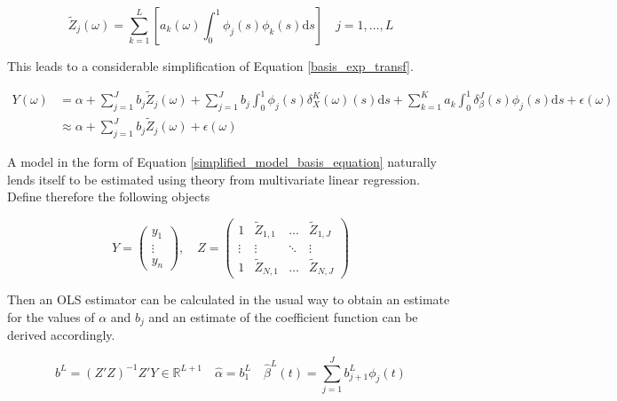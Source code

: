 \documentclass[11pt,twoside,a4paper]{article}
\begin{document}
	\begin{equation}
			\tilde{Z}_j(\omega) = \sum_{k = 1}^{L} \left[a_k(\omega) \int_{0}^{1} \phi_j(s) \phi_k(s) \mathrm{d}s \right] \quad j = 1, \dots, L
	\end{equation}

	This leads to a considerable simplification of Equation \ref{basis_exp_transf}.
	
	\begin{equation}\label{simplified_model_basis_equation}
		\begin{split}
			Y(\omega) &= \alpha + \sum_{j = 1}^{J} b_j \tilde{Z}_j(\omega) + \sum_{j = 1}^{J} b_j  \int_{0}^{1} \phi_j(s) \delta_{X}^{K}(\omega)(s) \mathrm{d}s + \sum_{k = 1}^{K} a_k  \int_{0}^{1} \delta_{\beta}^{J}(s)\phi_j(s) \mathrm{d}s + \epsilon(\omega) \\
			& \approx \alpha + \sum_{j = 1}^{J} b_j \tilde{Z}_j(\omega) + \epsilon(\omega)
		\end{split}
	\end{equation}

	A model in the form of Equation \ref{simplified_model_basis_equation} naturally lends itself to be estimated using theory from multivariate linear regression. Define therefore the following objects
	
	\begin{equation}\label{regressor_mat_1}
		Y = \begin{pmatrix}
			y_1 \\ \vdots \\ y_n
		\end{pmatrix}, \quad
		Z = \begin{pmatrix}
			1 & \tilde{Z}_{1,1} & \dots & \tilde{Z}_{1,J} \\
			\vdots & \vdots & \ddots & \vdots \\
			1 & \tilde{Z}_{N,1} & \dots & \tilde{Z}_{N,J}
		\end{pmatrix}
	\end{equation}
	
	Then an OLS estimator can be calculated in the usual way to obtain an estimate for the values of $\alpha$ and $b_j$ and an estimate of the coefficient function can be derived accordingly.
	
	\begin{equation}
		b^L = \left(Z'Z\right)^{-1}Z'Y \in \mathbb{R}^{L+1} \quad \hat{\alpha} = b_{1}^{L} \quad \hat{\beta}^L(t) = \sum_{j = 1}^{J} b_{j+1}^L \phi_j(t)
	\end{equation}
\end{document}
